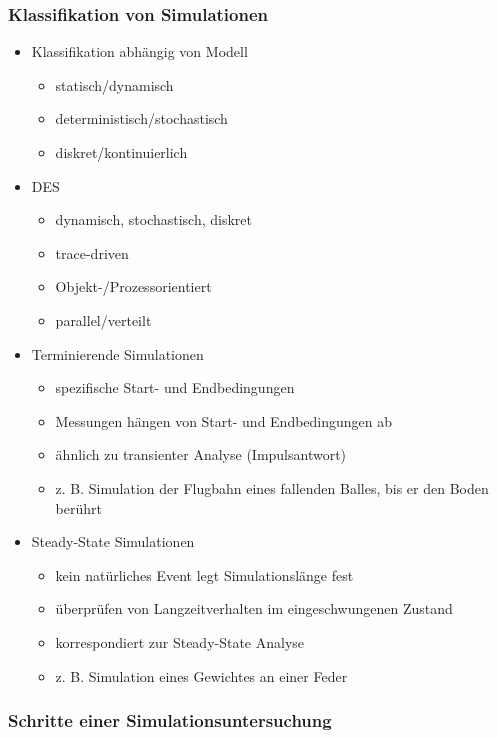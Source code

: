 \documentclass[nonacm=true, language=german]{acmart}
\begin{document}
\subsubsection{Klassifikation von Simulationen}

\begin{itemize}
    \item Klassifikation abhängig von Modell
    \begin{itemize}
        \item statisch/dynamisch
        \item deterministisch/stochastisch
        \item diskret/kontinuierlich
    \end{itemize}
    \item \ac{DES}
    \begin{itemize}
        \item dynamisch, stochastisch, diskret
        \item trace-driven
        \item Objekt-/Prozessorientiert
        \item parallel/verteilt
    \end{itemize}
    \item Terminierende Simulationen
    \begin{itemize}
        \item spezifische Start- und Endbedingungen
        \item Messungen hängen von Start- und Endbedingungen ab
        \item ähnlich zu transienter Analyse (Impulsantwort)
        \item z. B. Simulation der Flugbahn eines fallenden Balles, bis er den Boden berührt
    \end{itemize}
    \item Steady-State Simulationen
    \begin{itemize}
        \item kein natürliches Event legt Simulationslänge fest
        \item überprüfen von Langzeitverhalten im eingeschwungenen Zustand
        \item korrespondiert zur Steady-State Analyse
        \item z. B. Simulation eines Gewichtes an einer Feder
    \end{itemize}
\end{itemize}

\subsubsection{Schritte einer Simulationsuntersuchung}
\end{document}
